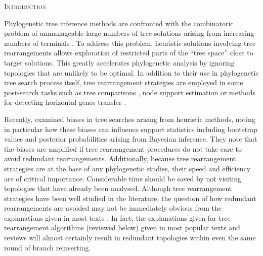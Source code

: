 \documentclass[12pt,letterpaper]{article}
\renewcommand{\section}[1]{%
\bigskip
\begin{center}
\begin{Large}
\normalfont\scshape #1
\medskip
\end{Large}
\end{center}}
\begin{document}
\section{Introduction}

Phylogenetic tree inference methods are confronted with the combinatoric problem of unmanageable large numbers of tree solutions arising from increasing numbers of terminals \citep{Felsenstein:1978vh}.
To address this problem, heuristic solutions involving tree rearrangements allows exploration of restricted parts of the ``tree space'' close to target solutions.
This greatly accelerates phylogenetic analysis by ignoring topologies that are unlikely to be optimal.
In addition to their use in phylogenetic tree search process itself, tree rearrangement strategies are employed in some post-search tasks such as tree comparisons \citep[e.g.][]{allen2001subtree,kuhner2015treComparison}, node support estimation \citep[e.g.][]{goloboff2014bias} or methods for detecting horizontal genes transfer \citep[e.g.][]{mcfadden1995something,bordewich2005computational}.

Recently, \citet{goloboff2014bias} examined biases in tree searches arising from heuristic methods, noting in particular how these biases can influence support statistics including bootstrap values and posterior probabilities arising from Bayesian inference.
They note that the biases are amplified if tree rearrangement %
procedures do not take care to avoid redundant rearrangements. %
Additionally, because tree rearrangement strategies are at the base of any phylogenetic studies, their speed and efficiency are of critical importance.
Considerable time should be saved by not visiting topologies that have already been analysed.
Although tree rearrangement strategies have been well studied in the literature, the question of how redundant rearrangements are avoided may not be immediately obvious from the explanations given in most texts \citep{swofford2003phylogeny,felsenstein2004inferring,wiley2011phylogenetics}.
In fact, the explanations given for tree rearrangement algorithms (reviewed below) given in most popular texts and reviews will almost certainly result in redundant topologies within even the same round of branch reinserting.
\end{document}
